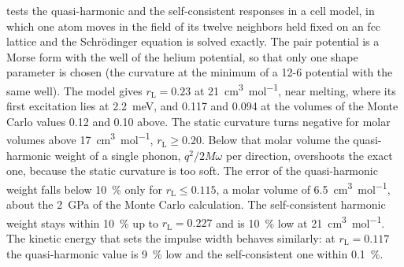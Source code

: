  tests the quasi-harmonic and the self-consistent responses in a cell model, in which one atom moves in the field of its twelve neighbors held fixed on an fcc lattice and the Schrödinger equation is solved exactly. The pair potential is a Morse form with the well of the helium potential, so that only one shape parameter is chosen (the curvature at the minimum of a 12-6 potential with the same well). The model gives $r_{\mathrm{L}} = 0.23$ at \SI{21}{cm^3.mol^{-1}}, near melting, where its first excitation lies at \SI{2.2}{meV}, and 0.117 and 0.094 at the volumes of the Monte Carlo values 0.12 and 0.10 above. The static curvature turns negative for molar volumes above \SI{17}{cm^3.mol^{-1}}, $r_{\mathrm{L}} \ge 0.20$. Below that molar volume the quasi-harmonic weight of a single phonon, $q^2/2M\omega$ per direction, overshoots the exact one, because the static curvature is too soft. The error of the quasi-harmonic weight falls below \SI{10}{\percent} only for $r_{\mathrm{L}} \le 0.115$, a molar volume of \SI{6.5}{cm^3.mol^{-1}}, about the \SI{2}{GPa} of the Monte Carlo calculation. The self-consistent harmonic weight stays within \SI{10}{\percent} up to $r_{\mathrm{L}} = 0.227$ and is \SI{10}{\percent} low at \SI{21}{cm^3.mol^{-1}}. The kinetic energy that sets the impulse width behaves similarly: at $r_{\mathrm{L}} = 0.117$ the quasi-harmonic value is \SI{9}{\percent} low and the self-consistent one within \SI{0.1}{\percent}.


